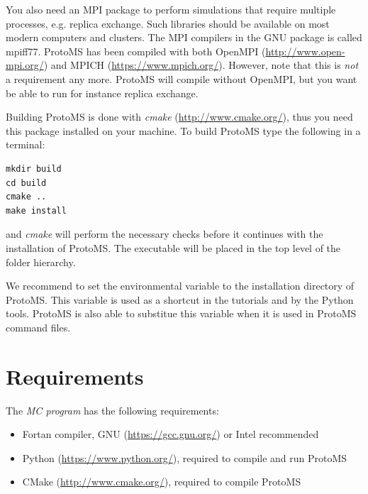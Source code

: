 \documentclass[letterpaper,10pt,english]{sphinxmanual}
\begin{document}
You also need an MPI package to perform simulations that require multiple processes, e.g. replica exchange. Such libraries should be available on most modern computers and clusters. The MPI compilers in the GNU package is called mpiff77. ProtoMS has been compiled with both OpenMPI (\href{http://www.open-mpi.org/}{http://www.open-mpi.org/}) and MPICH (\href{https://www.mpich.org/}{https://www.mpich.org/}). However, note that this is \emph{not} a requirement any more. ProtoMS will compile without OpenMPI, but you want be able to run for instance replica exchange.

Building ProtoMS is done with \emph{cmake} (\href{http://www.cmake.org/}{http://www.cmake.org/}), thus you need this package installed on your machine. To build ProtoMS type the following in a terminal:

\begin{Verbatim}[commandchars=\\\{\}]
mkdir build
cd build
cmake ..
make install
\end{Verbatim}

and \emph{cmake} will perform the necessary checks before it continues with the installation of ProtoMS. The executable will be placed in the top level of the folder hierarchy.

We recommend to set the environmental variable  to the installation directory of ProtoMS. This variable is used as a shortcut in the tutorials and by the Python tools. ProtoMS is also able to substitue this variable when it is used in ProtoMS command files.


\section{Requirements}
\label{compilation:requirements}
The \emph{MC program} has the following requirements:
\begin{itemize}
\item {} 
Fortan compiler, GNU (\href{https://gcc.gnu.org/}{https://gcc.gnu.org/}) or Intel recommended

\item {} 
Python (\href{https://www.python.org/}{https://www.python.org/}), required to compile and run ProtoMS

\item {} 
CMake (\href{http://www.cmake.org/}{http://www.cmake.org/}), required to compile ProtoMS

\end{itemize}
\end{document}
